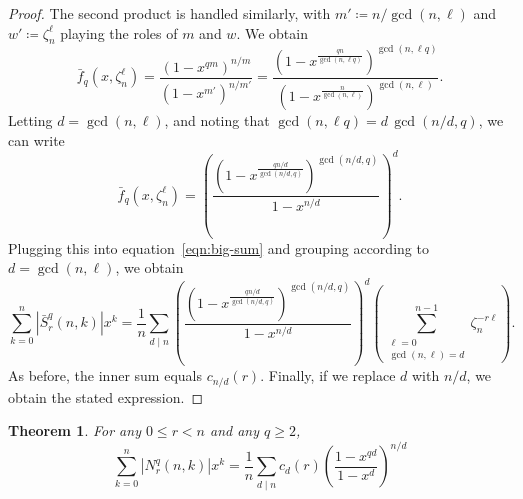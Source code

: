 \documentclass[12pt]{article}
\newcommand{\card}[1]{\left|#1\right|}
\newcommand{\nroot}{\zeta_n} %
\newcommand{\bS}{\bar{S}}
\newtheorem{theorem}{Theorem}[section]
\theoremstyle{definition}
\begin{document}
\begin{proof}
    The second product is handled similarly, with $m' \coloneqq n / \gcd(n, \ell)$ and $w' \coloneqq
    \nroot^{\ell}$ playing the roles of $m$ and $w$. We obtain
    \[
        \bar{f}_q(x, \nroot^\ell)
        = \frac{\left(1 - x^{qm}\right)^{n/m}}{\left(1 - x^{m'}\right)^{n/m'}}
        = \frac{ \left(1 - x^{\frac{qn}{\gcd(n, \ell q)}}\right)^{\gcd(n, \ell q)}}{\left(1 - x^{\frac{n}{\gcd(n, \ell)}}\right)^{\gcd(n, \ell)}}.
    \]
    Letting $d = \gcd(n, \ell)$, and noting that $
        \gcd(n, \ell q) = d\, \gcd \left( n/d, q\right)$,
    we can write
    \begin{equation*}
        \bar{f}_q(x, \nroot^\ell)
        = \left(\frac{\left(1 - x^{\frac{qn/d}{\gcd(n/d, q)}}\right)^{\gcd(n/d, q)}}{1 - x^{n / d}} \right)^d.
    \end{equation*}
    Plugging this into equation~\eqref{eqn:big-sum} and grouping according to $d = \gcd(n, \ell)$, we obtain
    \begin{equation*}
        \sum_{k=0}^n \card{\bS_r^q(n, k)} x^k
        =
        \frac{1}{n} \sum_{d \mid n} \left(\frac{\left(1 - x^{\frac{qn/d}{\gcd(n/d, q)}}\right)^{\gcd(n/d, q)}}{1 - x^{n / d}} \right)^d \left( \sum_{\substack{\ell = 0 \\ \gcd(n, \ell) = d}}^{n-1}  \nroot^{-r\ell} \right).
    \end{equation*}
    As before, the inner sum equals $c_{n/d}(r)$. Finally, if we replace $d$ with $n / d$, we obtain the stated expression.
\end{proof}


\begin{theorem}
    \label{thm:q-N}
    For any $0\le r< n$ and any $q \ge 2$,
    \begin{equation*}
    \sum_{k=0}^n \card{N_r^q(n, k)} x^k
        = \frac{1}{n} \sum_{d \mid n} c_{d}(r)
        \left(\frac{1 - x^{qd}}{1 - x^d}\right)^{n/d}
    \end{equation*}
\end{theorem}
\end{document}
